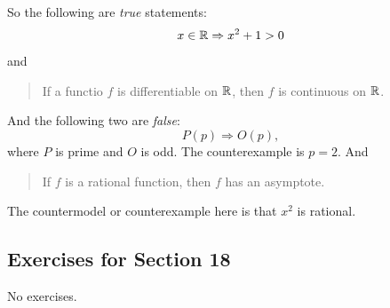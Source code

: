 So the following are \emph{true} statements: 
$$
x\in\mathbb{R}\Rightarrow x^{2}+1>0
$$
and 
\begin{quote}
    If a functio $f$ is differentiable on $\mathbb{R}$, then $f$ is continuous on $\mathbb{R}$. 
\end{quote}
And the following two are \emph{false}: 
$$
P(p)\Rightarrow O(p),
$$
where $P$ is prime and $O$ is odd. The counterexample is $p=2$. 
And 
\begin{quote}
    If $f$ is a rational function, then $f$ has an asymptote.
\end{quote}
The countermodel or counterexample here is that $x^{2}$ is rational. 
\subsection{Exercises for Section 18}
No exercises. 



 